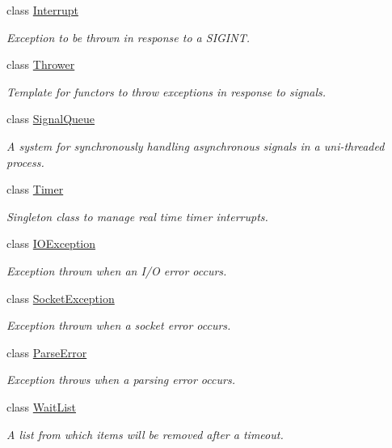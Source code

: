 \begin{DoxyCompactItemize}
class \hyperlink{classLibWheel_1_1Interrupt}{\-Interrupt}
\begin{DoxyCompactList}\small\item\em \-Exception to be thrown in response to a \-S\-I\-G\-I\-N\-T. \end{DoxyCompactList}\item 
class \hyperlink{classLibWheel_1_1Thrower}{\-Thrower}
\begin{DoxyCompactList}\small\item\em \-Template for functors to throw exceptions in response to signals. \end{DoxyCompactList}\item 
class \hyperlink{classLibWheel_1_1SignalQueue}{\-Signal\-Queue}
\begin{DoxyCompactList}\small\item\em \-A system for synchronously handling asynchronous signals in a uni-\/threaded process. \end{DoxyCompactList}\item 
class \hyperlink{classLibWheel_1_1Timer}{\-Timer}
\begin{DoxyCompactList}\small\item\em \-Singleton class to manage real time timer interrupts. \end{DoxyCompactList}\item 
class \hyperlink{classLibWheel_1_1IOException}{\-I\-O\-Exception}
\begin{DoxyCompactList}\small\item\em \-Exception thrown when an \-I/\-O error occurs. \end{DoxyCompactList}\item 
class \hyperlink{classLibWheel_1_1SocketException}{\-Socket\-Exception}
\begin{DoxyCompactList}\small\item\em \-Exception thrown when a socket error occurs. \end{DoxyCompactList}\item 
class \hyperlink{classLibWheel_1_1ParseError}{\-Parse\-Error}
\begin{DoxyCompactList}\small\item\em \-Exception throws when a parsing error occurs. \end{DoxyCompactList}\item 
class \hyperlink{classLibWheel_1_1WaitList}{\-Wait\-List}
\begin{DoxyCompactList}\small\item\em \-A list from which items will be removed after a timeout. \end{DoxyCompactList}\end{DoxyCompactItemize}
